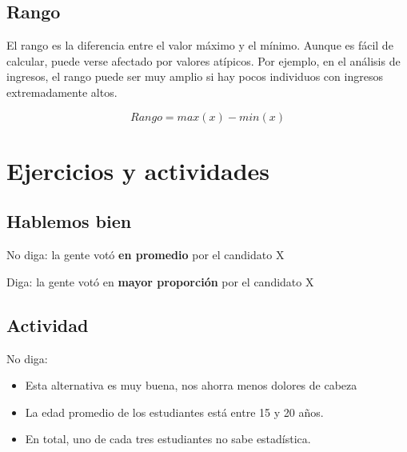 \documentclass[
  letterpaper,
  DIV=11,
  numbers=noendperiod]{scrreprt}
\begin{document}
\subsection{Rango}\label{rango}

El rango es la diferencia entre el valor máximo y el mínimo. Aunque es
fácil de calcular, puede verse afectado por valores atípicos. Por
ejemplo, en el análisis de ingresos, el rango puede ser muy amplio si
hay pocos individuos con ingresos extremadamente altos.

\begin{tcolorbox}[enhanced jigsaw, toprule=.15mm, opacitybacktitle=0.6, toptitle=1mm, arc=.35mm, left=2mm, title=\textcolor{quarto-callout-warning-color}{\faExclamationTriangle}\hspace{0.5em}{Warning}, titlerule=0mm, leftrule=.75mm, rightrule=.15mm, coltitle=black, bottomtitle=1mm, bottomrule=.15mm, colframe=quarto-callout-warning-color-frame, opacityback=0, colback=white, breakable, colbacktitle=quarto-callout-warning-color!10!white]

\[Rango = max(x) - min(x)\]

\end{tcolorbox}

\section{Ejercicios y actividades}\label{ejercicios-y-actividades}

\subsection{Hablemos bien}\label{hablemos-bien}

No diga: la gente votó \textbf{en promedio} por el candidato X

Diga: la gente votó en \textbf{mayor proporción} por el candidato X

\subsection{Actividad}\label{actividad}

No diga:

\begin{itemize}
\item
  Esta alternativa es muy buena, nos ahorra menos dolores de cabeza
\item
  La edad promedio de los estudiantes está entre 15 y 20 años.
\item
  En total, uno de cada tres estudiantes no sabe estadística.
\end{itemize}
\end{document}
